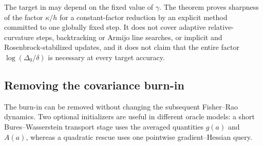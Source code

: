 \begin{remark}
\label{rem:global:bump-scope}
The target in  may depend on the fixed value of \(\gamma\).  The theorem
proves sharpness of the factor \(\kappa/h\) for a constant-factor reduction by an explicit method
committed to one globally fixed step.  It does not cover adaptive relative-curvature steps,
backtracking or Armijo line searches, or implicit and Rosenbrock-stabilized updates, and it does not
claim that the entire factor \(\log(\Delta_0/\delta)\) is necessary at every target accuracy.
\end{remark}

\subsection{Removing the covariance burn-in}
\label{sec:global:warm-starts}

The burn-in can be removed without changing the subsequent Fisher--Rao dynamics.  Two optional
initializers are useful in different oracle models: a short Bures--Wasserstein transport stage uses
the averaged quantities \(g(a)\) and \(A(a)\), whereas a quadratic rescue uses one pointwise
gradient--Hessian query.

